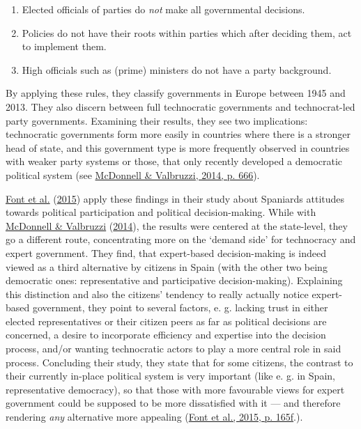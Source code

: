 \documentclass[
  12pt,
  english,
]{article}
\providecommand{\tightlist}{%
  \setlength{\itemsep}{0pt}\setlength{\parskip}{0pt}}
\begin{document}
\begin{enumerate}
\def\labelenumi{\arabic{enumi}.}
\tightlist
\item
  Elected officials of parties do \emph{not} make all governmental
  decisions.
\item
  Policies do not have their roots within parties which after deciding
  them, act to implement them.
\item
  High officials such as (prime) ministers do not have a party
  background.
\end{enumerate}

By applying these rules, they classify governments in Europe between
1945 and 2013. They also discern between full technocratic governments
and technocrat-led party governments. Examining their results, they see
two implications: technocratic governments form more easily in countries
where there is a stronger head of state, and this government type is
more frequently observed in countries with weaker party systems or
those, that only recently developed a democratic political system (see
\protect\hyperlink{ref-mcdonnell2014defining}{McDonnell \& Valbruzzi,
2014, p. 666}).

\protect\hyperlink{ref-font2015participation}{Font et al.}
(\protect\hyperlink{ref-font2015participation}{2015}) apply these
findings in their study about Spaniards attitudes towards political
participation and political decision-making. While with
\protect\hyperlink{ref-mcdonnell2014defining}{McDonnell \& Valbruzzi}
(\protect\hyperlink{ref-mcdonnell2014defining}{2014}), the results were
centered at the state-level, they go a different route, concentrating
more on the `demand side' for technocracy and expert government. They
find, that expert-based decision-making is indeed viewed as a third
alternative by citizens in Spain (with the other two being democratic
ones: representative and participative decision-making). Explaining this
distinction and also the citizens' tendency to really actually notice
expert-based government, they point to several factors, e. g. lacking
trust in either elected representatives or their citizen peers as far as
political decisions are concerned, a desire to incorporate efficiency
and expertise into the decision process, and/or wanting technocratic
actors to play a more central role in said process. Concluding their
study, they state that for some citizens, the contrast to their
currently in-place political system is very important (like e. g. in
Spain, representative democracy), so that those with more favourable
views for expert government could be supposed to be more dissatisfied
with it --- and therefore rendering \emph{any} alternative more
appealing (\protect\hyperlink{ref-font2015participation}{Font et al.,
2015, p. 165f}.).
\end{document}
